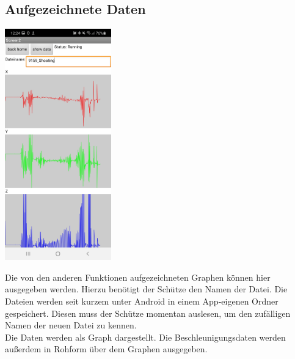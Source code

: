\subsection{Aufgezeichnete Daten}
    \begin{minipage}{0.5\textwidth}
        \includegraphics[height=10cm]{Bilder/GraphRec.jpg}
    \end{minipage}
    \hfill
    \begin{minipage}{0.5\textwidth}
        Die von den anderen Funktionen aufgezeichneten Graphen können hier ausgegeben
        werden. Hierzu benötigt der Schütze den Namen der Datei. Die Dateien werden
        seit kurzem unter Android in einem App-eigenen Ordner gespeichert. Diesen muss
        der Schütze momentan auslesen, um den zufälligen Namen der neuen Datei zu kennen.\\
        Die Daten werden als Graph dargestellt. Die Beschleunigungsdaten werden außerdem
        in Rohform über dem Graphen ausgegeben.\\
    \end{minipage}
